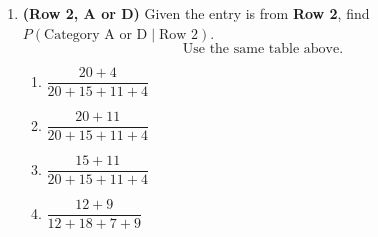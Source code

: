 \begin{enumerate}[label=\textbf{S\arabic*.}]
\item \textbf{(Row 2, A or D)} Given the entry is from \textbf{Row 2}, find $P(\text{Category A or D}\mid \text{Row 2})$.
\[
\text{Use the same table above.}
\]
\begin{enumerate}[label=(\Alph*)]
\item $\dfrac{20+4}{20+15+11+4}$
\item $\dfrac{20+11}{20+15+11+4}$
\item $\dfrac{15+11}{20+15+11+4}$
\item $\dfrac{12+9}{12+18+7+9}$
\end{enumerate}

\end{enumerate}









